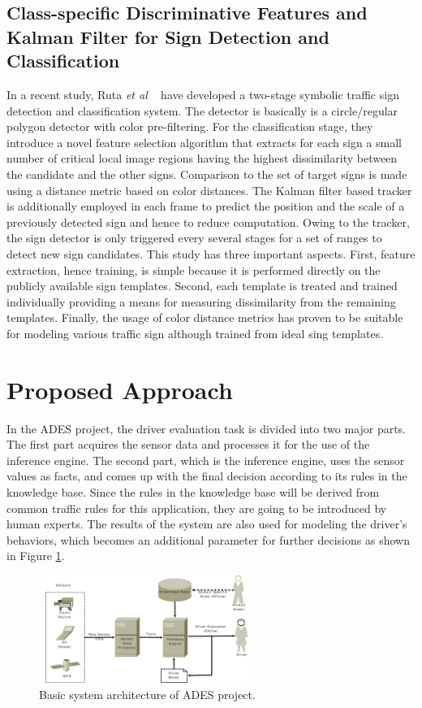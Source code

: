 \documentclass[review,number]{elsarticle}
\begin{document}
\subsection{Class-specific Discriminative	Features and Kalman Filter for Sign Detection and Classification}
In a recent study, Ruta \textit{et al} ~\cite{signbib19} have developed a two-stage symbolic traffic sign detection and classification system. The detector is basically is a circle/regular polygon detector with color pre-filtering. For the classification stage, they introduce a novel feature selection algorithm that extracts for each sign a small number of critical local image regions having the highest dissimilarity between the candidate and the other signs. Comparison to the set of target signs is made using a distance metric based on color distances. The Kalman filter based tracker is additionally employed in each frame to predict the position and the scale of a previously detected sign and hence to reduce computation. Owing to the tracker, the sign detector is only triggered every several stages for a set of ranges to detect new sign candidates. This study has three important aspects. First, feature extraction, hence training, is simple because it is performed directly on the publicly available sign templates. Second, each template is treated and trained individually providing a means for measuring dissimilarity from the remaining templates. Finally, the usage of color distance metrics has proven to be suitable for modeling various traffic sign although trained from ideal sing templates.

\section{Proposed Approach}
\label{sec:pa}

In the ADES project, the driver evaluation task is divided into two major parts. The first part acquires the sensor data and processes it for the use of the inference engine. The second part, which is the inference engine, uses the sensor values as facts, and comes up with the final decision according to its rules in the knowledge base. Since the rules in the knowledge base will be derived from common traffic rules for this application, they are going to be introduced by human experts. The results of the system are also used for modeling the driver's behaviors, which becomes an additional parameter for further decisions as shown in Figure \ref{fig:sys}.

\begin{figure}[ht]
\begin{center}
\includegraphics[width=70mm,height=35mm]{img/sys3.eps}
\caption{Basic system architecture of ADES project.}
\label{fig:sys}
\end{center}
\end{figure}
\par
\end{document}
